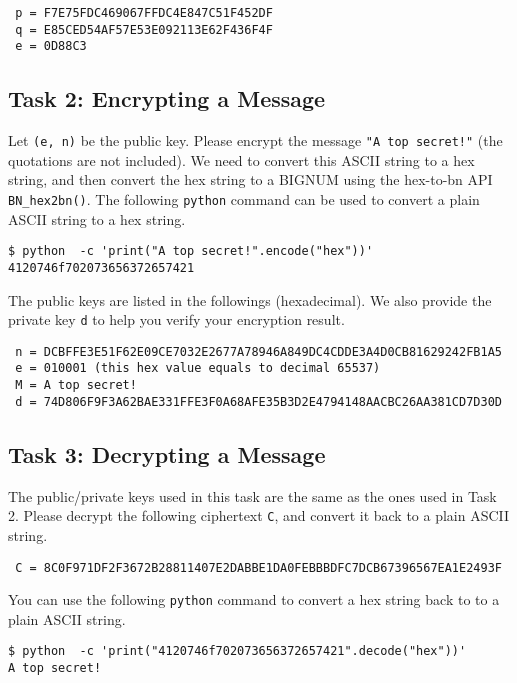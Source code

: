 \begin{lstlisting}
 p = F7E75FDC469067FFDC4E847C51F452DF
 q = E85CED54AF57E53E092113E62F436F4F
 e = 0D88C3
\end{lstlisting}


\subsection{Task 2: Encrypting a Message}

Let \texttt{(e, n)} be the public key. Please encrypt the message
\texttt{"A top secret!"} (the quotations are not included).
We need to convert this ASCII string to a hex string, and then
convert the hex string to a BIGNUM using the hex-to-bn API \texttt{BN\_hex2bn()}.
The following \texttt{python} command can be used
to convert a plain ASCII string to a hex string.

\begin{lstlisting}
$ python  -c 'print("A top secret!".encode("hex"))'
4120746f702073656372657421
\end{lstlisting}


The public keys are listed in the followings (hexadecimal).  We also provide the private key \texttt{d}
 to help you verify your encryption
result.

\begin{lstlisting}
 n = DCBFFE3E51F62E09CE7032E2677A78946A849DC4CDDE3A4D0CB81629242FB1A5
 e = 010001 (this hex value equals to decimal 65537)
 M = A top secret!
 d = 74D806F9F3A62BAE331FFE3F0A68AFE35B3D2E4794148AACBC26AA381CD7D30D
\end{lstlisting}



\subsection{Task 3: Decrypting a Message}

The public/private keys used in this task are the same as the ones used in Task 2.
Please decrypt the following ciphertext \texttt{C}, and convert it back to
a plain ASCII string.

\begin{lstlisting}
 C = 8C0F971DF2F3672B28811407E2DABBE1DA0FEBBBDFC7DCB67396567EA1E2493F
\end{lstlisting}


You can use the following \texttt{python} command to convert
a hex string back to to a plain ASCII string.
\begin{lstlisting}
$ python  -c 'print("4120746f702073656372657421".decode("hex"))'
A top secret!
\end{lstlisting}



